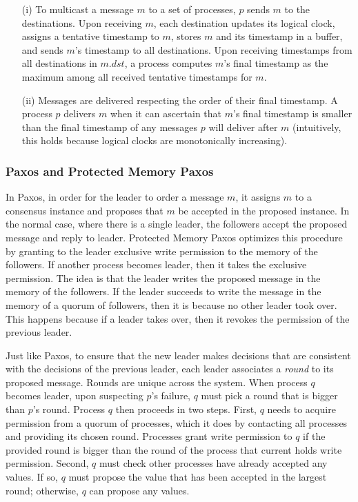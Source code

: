 \begin{itemize}
\item[(i)] To multicast a message $m$ to a set of processes, $p$ sends $m$ to the destinations.
Upon receiving $m$, each destination updates its logical clock, assigns a tentative timestamp to $m$, stores $m$ and its timestamp in a buffer, and sends $m$'s timestamp to all destinations.
Upon receiving timestamps from all destinations in $m.dst$, a process computes $m$'s final timestamp as the maximum among all received tentative timestamps for $m$.
\item[(ii)]Messages are delivered respecting the order of their final timestamp.
A process $p$ delivers $m$ when it can ascertain that $m$'s final timestamp is smaller than the final timestamp of any messages $p$ will deliver after $m$ (intuitively, this holds because logical clocks are monotonically increasing).
\end{itemize}

\subsubsection{Paxos and Protected Memory Paxos}

In Paxos, in order for the leader to order a message $m$, it assigns $m$ to a consensus instance and proposes that $m$ be accepted in the proposed instance.
In the normal case, where there is a single leader, the followers accept the proposed message and reply to leader.
Protected Memory Paxos optimizes this procedure by granting to the leader exclusive write permission to the memory of the followers.
If another process becomes leader, then it takes the exclusive permission.
The idea is that the leader writes the proposed message in the memory of the followers.
If the leader succeeds to write the message in the memory of a quorum of followers, then it is because no other leader took over.
This happens because if a leader takes over, then it revokes the permission of the previous leader.

Just like Paxos, to ensure that the new leader makes decisions that are consistent with the decisions of the previous leader, each leader associates a \emph{round} to its proposed message.
Rounds are unique across the system.
When process $q$ becomes leader, upon suspecting $p$'s failure, $q$ must pick a round that is bigger than $p$'s round.
Process $q$ then proceeds in two steps.
First, $q$ needs to acquire permission from a quorum of processes, which it does by contacting all processes and providing its chosen round.
Processes grant write permission to $q$ if the provided round is bigger than the round of the process that current holds write permission.
Second, $q$ must check other processes have already accepted any values.
If so, $q$ must propose the value that has been accepted in the largest round; otherwise, $q$ can propose any values.

